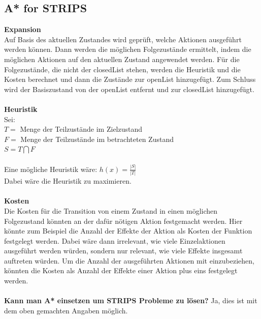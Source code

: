 \documentclass{../Vorlage/mat}
\begin{document}
\subsection*{A* for STRIPS}
\textbf{Expansion}\\
Auf Basis des aktuellen Zustandes wird geprüft, welche Aktionen ausgeführt werden können. Dann werden die möglichen Folgezustände ermittelt, indem die möglichen Aktionen auf den aktuellen Zustand angewendet werden. Für die Folgezustände, die nicht der closedList stehen, werden die Heuristik und die Kosten berechnet und dann die Zustände zur openList hinzugefügt. Zum Schluss wird der Basiszustand von der openList entfernt und zur closedList hinzugefügt.\\
\\
\textbf{Heuristik}\\
Sei:\\
$T = $ Menge der Teilzustände im Zielzustand\\
$F = $ Menge der Teilzustände im betrachteten Zustand\\
$S = T \bigcap F$\\
\\
Eine mögliche Heuristik wäre: $h(x) = \frac{|S|}{|T|}$\\
Dabei wäre die Heuristik zu maximieren.\\
\\
\textbf{Kosten}\\
Die Kosten für die Transition von einem Zustand in einen möglichen Folgezustand könnten an der dafür nötigen Aktion festgemacht werden. Hier könnte zum Beispiel die Anzahl der Effekte der Aktion als Kosten der Funktion festgelegt werden. Dabei wäre dann irrelevant, wie viele Einzelaktionen ausgeführt werden würden, sondern nur relevant, wie viele Effekte insgesamt auftreten würden. Um die Anzahl der ausgeführten Aktionen mit einzubeziehen, könnten die Kosten als Anzahl der Effekte einer Aktion plus eins festgelegt werden.\\
\\
\textbf{Kann man A* einsetzen um STRIPS Probleme zu lösen?}
Ja, dies ist mit dem oben gemachten Angaben möglich.
\end{document}
